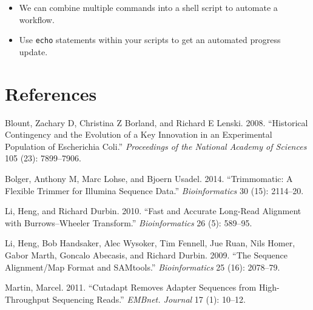 \documentclass[
  letterpaper,
  DIV=11,
  numbers=noendperiod]{scrreprt}
\providecommand{\tightlist}{%
  \setlength{\itemsep}{0pt}\setlength{\parskip}{0pt}}\usepackage{longtable,booktabs,array}
\newlength{\cslhangindent}
\newlength{\cslentryspacingunit} %
\newenvironment{CSLReferences}[2] %
 {%
  \setlength{\parindent}{0pt}
  \ifodd #1
  \let\oldpar\par
  \def\par{\hangindent=\cslhangindent\oldpar}
  \fi
  \setlength{\parskip}{#2\cslentryspacingunit}
 }%
 {}
\begin{document}
\begin{tcolorbox}[enhanced jigsaw, toptitle=1mm, breakable, bottomrule=.15mm, colback=white, toprule=.15mm, opacityback=0, bottomtitle=1mm, coltitle=black, opacitybacktitle=0.6, rightrule=.15mm, colframe=quarto-callout-important-color-frame, titlerule=0mm, colbacktitle=quarto-callout-important-color!10!white, title=\textcolor{quarto-callout-important-color}{\faExclamation}\hspace{0.5em}{Key points}, left=2mm, leftrule=.75mm, arc=.35mm]

\begin{itemize}
\tightlist
\item
  We can combine multiple commands into a shell script to automate a
  workflow.
\item
  Use \texttt{echo} statements within your scripts to get an automated
  progress update.
\end{itemize}

\end{tcolorbox}


\hypertarget{references}{%
\chapter*{References}\label{references}}


\hypertarget{refs}{}
\begin{CSLReferences}{1}{0}
\leavevmode{}%
Blount, Zachary D, Christina Z Borland, and Richard E Lenski. 2008.
{``Historical Contingency and the Evolution of a Key Innovation in an
Experimental Population of Escherichia Coli.''} \emph{Proceedings of the
National Academy of Sciences} 105 (23): 7899--7906.

\leavevmode{}%
Bolger, Anthony M, Marc Lohse, and Bjoern Usadel. 2014. {``Trimmomatic:
A Flexible Trimmer for Illumina Sequence Data.''} \emph{Bioinformatics}
30 (15): 2114--20.

\leavevmode{}%
Li, Heng, and Richard Durbin. 2010. {``Fast and Accurate Long-Read
Alignment with Burrows--Wheeler Transform.''} \emph{Bioinformatics} 26
(5): 589--95.

\leavevmode{}%
Li, Heng, Bob Handsaker, Alec Wysoker, Tim Fennell, Jue Ruan, Nils
Homer, Gabor Marth, Goncalo Abecasis, and Richard Durbin. 2009. {``The
Sequence Alignment/Map Format and SAMtools.''} \emph{Bioinformatics} 25
(16): 2078--79.

\leavevmode{}%
Martin, Marcel. 2011. {``Cutadapt Removes Adapter Sequences from
High-Throughput Sequencing Reads.''} \emph{EMBnet. Journal} 17 (1):
10--12.

\end{CSLReferences}
\end{document}
